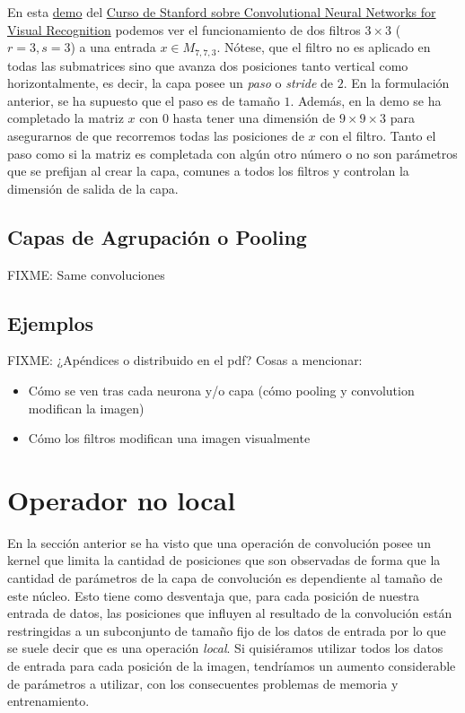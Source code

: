 En esta \href{https://cs231n.github.io/assets/conv-demo/index.html}{demo} del \href{http://cs231n.stanford.edu/}{Curso de Stanford sobre Convolutional Neural Networks for Visual Recognition} podemos ver el funcionamiento de dos filtros $3\times 3$ ($r=3,s=3$) a una entrada $x\in M_{7,7,3}$. Nótese, que el filtro no es aplicado en todas las submatrices sino que avanza dos posiciones tanto vertical como horizontalmente, es decir, la capa posee un \emph{paso} o \emph{stride} de $2$. En la formulación anterior, se ha supuesto que el paso es de tamaño $1$. Además, en la demo se ha completado la matriz $x$ con $0$ hasta tener una dimensión de $9\times 9\times 3$ para asegurarnos de que recorremos todas las posiciones de $x$ con el filtro. Tanto el paso como si la matriz es completada con algún otro número o no son parámetros que se prefijan al crear la capa, comunes a todos los filtros y controlan la dimensión de salida de la capa.


\section{Capas de Agrupación o Pooling}

FIXME: Same convoluciones

\section{Ejemplos}

FIXME: ¿Apéndices o distribuido en el pdf? Cosas a mencionar:

\begin{itemize}
\item Cómo se ven tras cada neurona y/o capa (cómo pooling y convolution modifican la imagen)
\item Cómo los filtros modifican una imagen visualmente
\end{itemize}

\chapter{Operador no local}\label{def:non-local}
En la sección anterior se ha visto que una operación de convolución posee un kernel que limita la cantidad de posiciones que son observadas de forma que la cantidad de parámetros de la capa de convolución es dependiente al tamaño de este núcleo. Esto tiene como desventaja que, para cada posición de nuestra entrada de datos, las posiciones que influyen al resultado de la convolución están restringidas a un subconjunto de tamaño fijo de los datos de entrada por lo que se suele decir que es una operación \emph{local}. Si quisiéramos utilizar todos los datos de entrada para cada posición de la imagen, tendríamos un aumento considerable de parámetros a utilizar, con los consecuentes problemas de memoria y entrenamiento.\\

